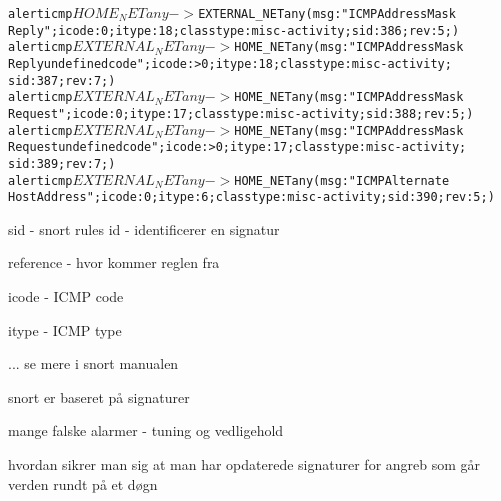\documentclass[Screen16to9,17pt]{foils}
\begin{document}

\begin{alltt}\small
alert icmp $HOME_NET any -> $EXTERNAL_NET any (msg:"ICMP Address Mask
Reply"; icode:0; itype:18; classtype:misc-activity; sid:386; rev:5;)
alert icmp $EXTERNAL_NET any -> $HOME_NET any (msg:"ICMP Address Mask
Reply undefined code"; icode:>0; itype:18; classtype:misc-activity;
sid:387; rev:7;)
alert icmp $EXTERNAL_NET any -> $HOME_NET any (msg:"ICMP Address Mask
Request"; icode:0; itype:17; classtype:misc-activity; sid:388; rev:5;)
alert icmp $EXTERNAL_NET any -> $HOME_NET any (msg:"ICMP Address Mask
Request undefined code"; icode:>0; itype:17; classtype:misc-activity;
sid:389; rev:7;)
alert icmp $EXTERNAL_NET any -> $HOME_NET any (msg:"ICMP Alternate
Host Address"; icode:0; itype:6; classtype:misc-activity; sid:390; rev:5;)
\end{alltt}

\begin{list2}
\item sid - snort rules id - identificerer en signatur
\item reference - hvor kommer reglen fra
\item icode - ICMP code
\item itype - ICMP type
\item ... se mere i snort manualen
\end{list2}



\begin{list1}
\item snort er baseret på signaturer
\item mange falske alarmer - tuning og vedligehold
\item hvordan sikrer man sig at man har opdaterede signaturer for
  angreb som går verden rundt på et døgn
\end{list1}

\end{document}
